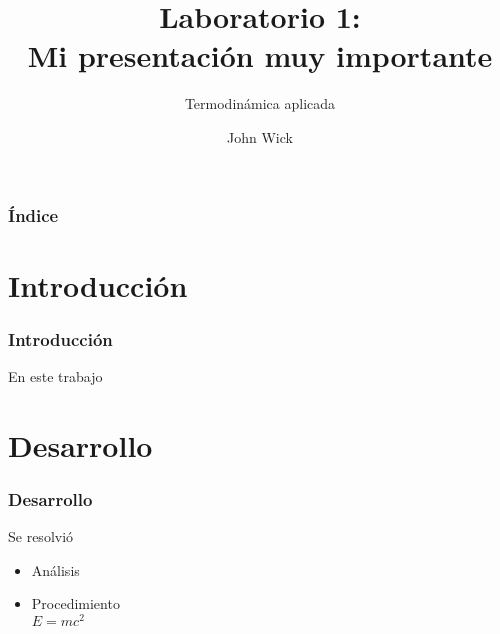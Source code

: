 \documentclass[aspectratio=169]{beamer}
\title{Laboratorio 1: \\Mi presentación muy importante}
\subtitle{Termodinámica aplicada}
\author{John Wick}
\institute{Profesor asistente:\\
William Landrón}
\begin{document}
\maketitle

\begin{frame}
	\frametitle{Índice}
	\tableofcontents
\end{frame}

\section{Introducción}
\begin{frame}
	\frametitle{Introducción}
	En este trabajo
\end{frame}

\section{Desarrollo}
\begin{frame}
	\frametitle{Desarrollo}
	Se resolvió
	\begin{itemize}
		\item Análisis
		\item Procedimiento\\
		$E=mc^2$
	\end{itemize}
\end{frame}
\end{document}
